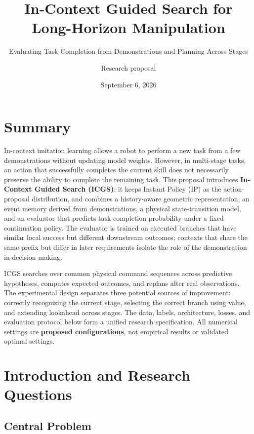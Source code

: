 \documentclass[
  10pt,
]{article}
\title{In-Context Guided Search for Long-Horizon Manipulation}
\subtitle{Evaluating Task Completion from Demonstrations and Planning Across Stages}
\author{Research proposal}
\date{September 6, 2026}
\begin{document}
\maketitle

{
\hypersetup{linkcolor=}
\setcounter{tocdepth}{2}
\tableofcontents
}
\newpage

\hypertarget{tuxf3m-tux1eaft}{%
\section{Summary}\label{tuxf3m-tux1eaft}}

In-context imitation learning allows a robot to perform a new task from a few demonstrations without updating model weights. However, in multi-stage tasks, an action that successfully completes the current skill does not necessarily preserve the ability to complete the remaining task. This proposal introduces \textbf{In-Context Guided Search (ICGS)}: it keeps Instant Policy (IP) as the action-proposal distribution, and combines a history-aware geometric representation, an event memory derived from demonstrations, a physical state-transition model, and an evaluator that predicts task-completion probability under a fixed continuation policy. The evaluator is trained on executed branches that have similar local success but different downstream outcomes; contexts that share the same prefix but differ in later requirements isolate the role of the demonstration in decision making.

ICGS searches over common physical command sequences across predictive hypotheses, computes expected outcomes, and replans after real observations. The experimental design separates three potential sources of improvement: correctly recognizing the current stage, selecting the correct branch using value, and extending lookahead across stages. The data, labels, architecture, losses, and evaluation protocol below form a unified research specification. All numerical settings are \textbf{proposed configurations}, not empirical results or validated optimal settings.

\hypertarget{giux1edbi-thiux1ec7u-vuxe0-cuxe2u-hux1ecfi-nghiuxean-cux1ee9u}{%
\section{Introduction and Research Questions}\label{giux1edbi-thiux1ec7u-vuxe0-cuxe2u-hux1ecfi-nghiuxean-cux1ee9u}}

\hypertarget{buxe0i-touxe1n-trung-tuxe2m}{%
\subsection{Central Problem}\label{buxe0i-touxe1n-trung-tuxe2m}}
\end{document}
